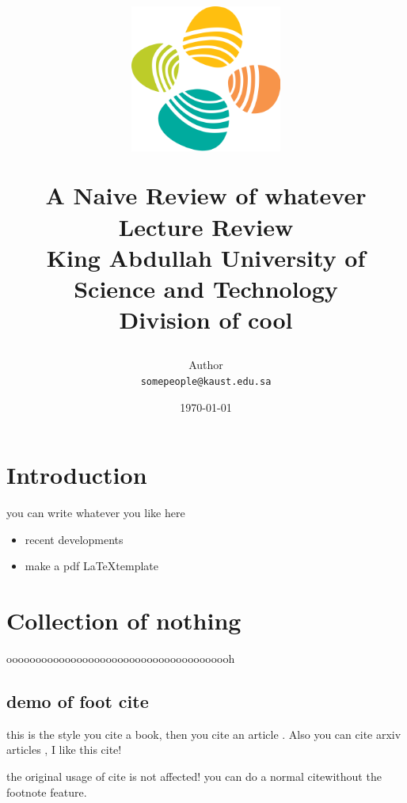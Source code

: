 \documentclass{article}
\title{
\centerline{\includegraphics[width=50mm]{Cover/kasut-logo.png}}
\vspace{0.5cm}
A Naive Review of whatever\\
\vspace{0.5cm}
\large Lecture Review\\
\small King Abdullah University of Science and Technology\\Division of cool}
\author{Author\\ \texttt{somepeople@kaust.edu.sa}}
\date{\today}
\begin{document}
\maketitle

\tableofcontents

\section{Introduction}
you can write whatever you like here
\begin{itemize}
    \item recent developments
    \item make a pdf \LaTeX template
\end{itemize}


\section{Collection of nothing}
ooooooooooooooooooooooooooooooooooooooh
\subsection{demo of foot cite}

this is the style you cite a book, then you cite an article . Also you can cite arxiv articles , I like this cite!

the original usage of cite is not affected! you can do a normal cite\cite{fernandez2020accelerating}without  the footnote feature.
\newpage
\printbibliography
\end{document}

